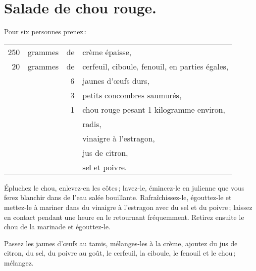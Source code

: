 \section*{\centering Salade de chou rouge.}
{}

Pour six personnes prenez :

\medskip

\footnotesize
\begin{longtable}{rrrp{16em}}
    250 & grammes & de & crème épaisse,                                                                   \\
     20 & grammes & de & cerfeuil, ciboule, fenouil, en parties égales,                                   \\
        &         &  6 & jaunes d'œufs durs,                                                              \\
        &         &  3 & petits concombres saumurés,                                                      \\
        &         &  1 & chou rouge pesant 1 kilogramme environ,                                          \\
        &         &    & radis,                                                                           \\
        &         &    & vinaigre à l'estragon,                                                           \\
        &         &    & jus de citron,                                                                   \\
        &         &    & sel et poivre.                                                                   \\
\end{longtable}
\normalsize

Épluchez le chou, enlevez-en les côtes ; lavez-le, émincez-le en julienne que
vous ferez blanchir dans de l’eau salée bouillante. Rafraîchissez-le,
égouttez-le et mettez-le à mariner dans du vinaigre à l'estragon avec du sel et
du poivre ; laissez en contact pendant une heure en le retournant fréquemment.
Retirez ensuite le chou de la marinade et égouttez-le.

Passez les jaunes d'œufs au tamis, mélanges-les à la crème, ajoutez du jus de
citron, du sel, du poivre au goût, le cerfeuil, la ciboule, le fenouil et le
chou ; mélangez.

